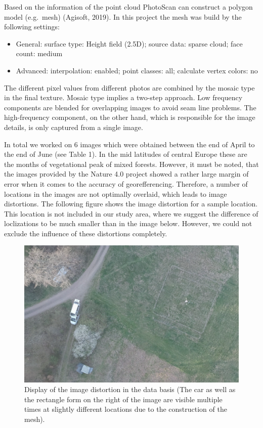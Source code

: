 \documentclass[]{article}
\begin{document}
Based on the information of the point cloud PhotoScan can construct a
polygon model (e.g.~mesh) (Agisoft, 2019). In this project the mesh was
build by the following settings:

\begin{itemize}
\item
  General: surface type: Height field (2.5D); source data: sparse cloud;
  face count: medium
\item
  Advanced: interpolation: enabled; point classes: all; calculate vertex
  colors: no
\end{itemize}

The different pixel values from different photos are combined by the
mosaic type in the final texture. Mosaic type implies a two-step
approach. Low frequency components are blended for overlapping images to
avoid seam line problems. The high-frequency component, on the other
hand, which is responsible for the image details, is only captured from
a single image.

In total we worked on 6 images which were obtained between the end of
April to the end of June (see Table 1). In the mid latitudes of central
Europe these are the months of vegetational peak of mixed forests.
However, it must be noted, that the images provided by the Nature 4.0
project showed a rather large margin of error when it comes to the
accuracy of georefferencing. Therefore, a number of locations in the
images are not optimally overlaid, which leads to image distortions. The
following figure shows the image distortion for a sample location. This
location is not included in our study area, where we suggest the
difference of loclizations to be much smaller than in the image below.
However, we could not exclude the influence of these distortions
completely.

\begin{figure}[H]

{\centering \includegraphics[width=0.6\linewidth]{report_files/figure-latex/Image distortion-1} 

}

\caption{Display of the image distortion in the data basis (The car as well as the rectangle form on the right of the image are visible multiple times at slightly different locations due to the construction of the mesh).}\label{fig:Image distortion}
\end{figure}
\end{document}
